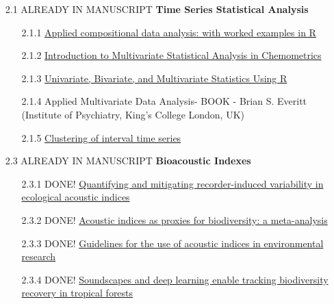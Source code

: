 \begin{enumerate}
\begin{enumerate}
            \item [2.1] ALREADY IN MANUSCRIPT \textbf{Time Series Statistical Analysis}
            \begin{enumerate}
                \item [2.1.1] \href{https://doi.org/10.1002/bimj.201900263}{Applied compositional data analysis: with worked examples in R}
                \item [2.1.2] \href{https://ebookcentral.proquest.com/lib/viennaut/detail.action?docID=427098}{Introduction to Multivariate Statistical Analysis in Chemometrics}
                \item [2.1.3] \href{https://doi.org/10.1002/9781119549963}{Univariate, Bivariate, and Multivariate Statistics Using R}
                \item [2.1.4] Applied Multivariate Data Analysis- BOOK - Brian S. Everitt (Institute of Psychiatry, King's College London, UK)
                \item [2.1.5] \href{https://doi.org/10.1007/s11222-018-09851-z}{Clustering of interval time series}
            \end{enumerate}
            
            \item [2.3] ALREADY IN MANUSCRIPT \textbf{Bioacoustic Indexes}
            \begin{enumerate}
                \item [2.3.1] DONE! \href{https://doi.org/10.1016/j.ecoinf.2024.102668}{Quantifying and mitigating recorder-induced variability in ecological acoustic indices}
                \item [2.3.2] DONE! \href{https://doi.org/10.1111/brv.12890}{Acoustic indices as proxies for biodiversity: a meta-analysis}
                \item [2.3.3] DONE! \href{https://doi.org/10.1111/2041-210X.13254}{Guidelines for the use of acoustic indices in environmental research}
                \item [2.3.4] DONE! \href{https://doi.org/10.1038/s41467-023-41693-w}{Soundscapes and deep learning enable tracking biodiversity recovery in tropical forests}
            \end{enumerate}


\end{enumerate}
\end{enumerate}
